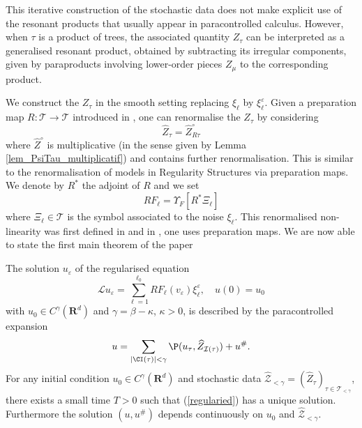 \documentclass[11pt]{preprint}
\def\CT{\mathcal{T}}
\newcommand{\mcI}{\mathcal{I}}
\newcommand{\mcZ}{\mathcal{Z}}
\newcommand{\mcT}{\mathcal{T}}
\newcounter{theorem}
\def\eps{\varepsilon}
\let\eps\varepsilon
\def\eqref#1{(\ref{#1})}
\newcommand{\bfR}{\mathbf{R}}
\newcommand{\scrL}{\mathscr{L}}
\begin{document}
	 This iterative construction of the stochastic data does not make explicit use of the resonant products that usually appear in paracontrolled calculus. However, when $\tau$ is a product of trees, the associated quantity $Z_\tau$ can be interpreted as a generalised resonant product,  obtained by subtracting 
	  its irregular components, given by paraproducts involving lower-order pieces $Z_\mu$ to the corresponding product.
	 
	
	
	We construct the $Z_{\tau}$ in the smooth setting replacing $ \xi_{\ell} $ by $ \xi_{\ell}^{\eps} $.
	Given a preparation map $ R : \CT \rightarrow \CT $ introduced in \cite{BR18}, one can renormalise the $Z_{\tau}$ by considering 
	\begin{equation*}
		\widehat{Z}_{\tau} = \widehat{Z}^{\circ}_{R \tau}
	\end{equation*}
	where $\widehat{Z}^{\circ}$ is multiplicative (in the sense given by Lemma \ref{lem_PsiTau_multiplicatif}) and contains further renormalisation. This is similar to the renormalisation of models in Regularity Structures via preparation maps. We denote by $R^{*}$ the adjoint of $R$ and we set
	\begin{equation*}
		R F_{\ell} = \Upsilon_F[R^* \Xi_{\ell}]
	\end{equation*}
	where $ \Xi_{\ell} \in \CT $ is the symbol associated to the noise $\xi_{\ell}$.  This renormalised non-linearity was first defined in \cite{BCCH} and in \cite{RenomrmalisedSpde}, one uses preparation maps.
		We are now able to state the first main theorem of the paper
	\begin{theorem} \label{main_theorem}
		The solution $ u_{\eps}$ of the regularised equation
		\begin{equation}
			\label{regularied}
				\scrL u_{\eps} = \sum_{\ell=1}^{\ell_0} R F_\ell(v_{\eps})\xi_\ell^{\eps}, \quad u(0) = u_0
		\end{equation}
		with $ u_0 \in C^{\gamma}(\bfR^d)$ and $\gamma = \beta - \kappa $, $\kappa >0$,  
		is described by the paracontrolled expansion 
		\begin{equation}
		\label{renormalised_ansatz}	u= \sum_{|\CI(\tau)| < \gamma} \P (u_\tau, \widehat{Z}_{\mcI(\tau)}) + u^\#.
		\end{equation}
			For any initial condition $u_0 \in  C^\gamma(\bfR^d)$ and stochastic data $\widehat{\mcZ}_{< \gamma}=(\widehat{Z}_\tau)_{\tau\in\mcT_{<\gamma}}$, there exists a small time $T>0$ such that  \eqref{regularied} has a unique solution. Furthermore the solution $(u,u^\#)$ depends continuously on $u_0$ and $\widehat{\mcZ}_{< \gamma}$. 
		\end{theorem}
	
\end{document}
